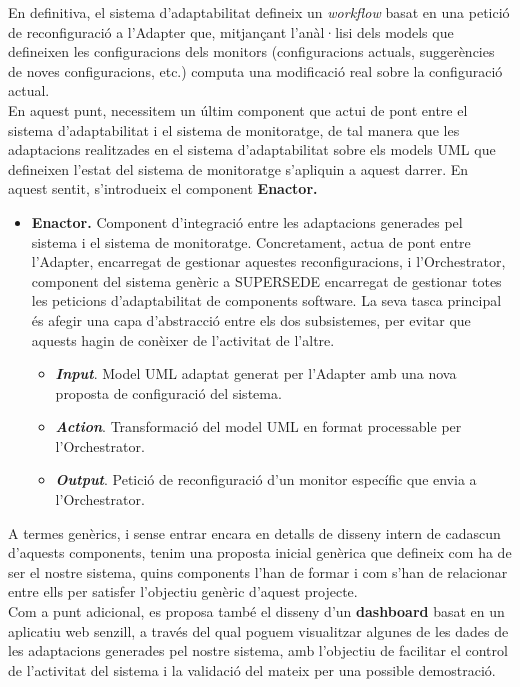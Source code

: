 En definitiva, el sistema d'adaptabilitat defineix un \textit{workflow} basat en una petició de reconfiguració a l'Adapter que, mitjançant l'anàl·lisi dels models que defineixen les configuracions dels monitors (configuracions actuals, suggerències de noves configuracions, etc.) computa una modificació real sobre la configuració actual.\\

En aquest punt, necessitem un últim component que actui de pont entre el sistema d'adaptabilitat i el sistema de monitoratge, de tal manera que les adaptacions realitzades en el sistema d'adaptabilitat sobre els models UML que defineixen l'estat del sistema de monitoratge s'apliquin a aquest darrer. En aquest sentit, s'introdueix el component \textbf{Enactor.}

\begin{itemize}
\item \textbf{Enactor.} Component d'integració entre les adaptacions generades pel sistema i el sistema de monitoratge. Concretament, actua de pont entre l'Adapter, encarregat de gestionar aquestes reconfiguracions, i l'Orchestrator, component del sistema genèric a SUPERSEDE encarregat de gestionar totes les peticions d'adaptabilitat de components software. La seva tasca principal és afegir una capa d'abstracció entre els dos subsistemes, per evitar que aquests hagin de conèixer de l'activitat de l'altre.
\begin{itemize}
\item \textbf{\textit{Input}}. Model UML adaptat generat per l'Adapter amb una nova proposta de configuració del sistema.
\item \textbf{\textit{Action}}. Transformació del model UML en format processable per l'Orchestrator.
\item \textbf{\textit{Output}}. Petició de reconfiguració d'un monitor específic que envia a l'Orchestrator.
\end{itemize}
\end{itemize}

A termes genèrics, i sense entrar encara en detalls de disseny intern de cadascun d'aquests components, tenim una proposta inicial genèrica que defineix com ha de ser el nostre sistema, quins components l'han de formar i com s'han de relacionar entre ells per satisfer l'objectiu genèric d'aquest projecte.\\

Com a punt adicional, es proposa també el disseny d'un \textbf{dashboard} basat en un aplicatiu web senzill, a través del qual poguem visualitzar algunes de les dades de les adaptacions generades pel nostre sistema, amb l'objectiu de facilitar el control de l'activitat del sistema i la validació del mateix per una possible demostració.